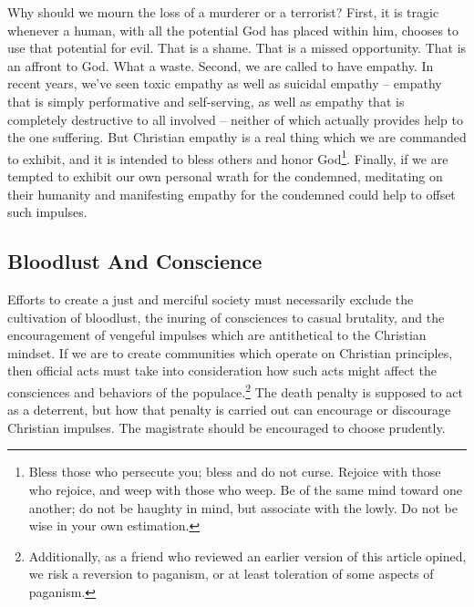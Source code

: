 Why should we mourn the loss of a murderer or a terrorist? First, it is tragic whenever a human, with all the potential God has placed within him, chooses to use that potential for evil.  That is a shame.  That is a missed opportunity.  That is an affront to God.  What a waste.  Second, we are called to have empathy.  In recent years, we've seen toxic empathy as well as suicidal empathy -- empathy that is simply performative and self-serving, as well as empathy that is completely destructive to all involved -- neither of which actually provides help to the one suffering.  But Christian empathy is a real thing which we are commanded to exhibit, and it is intended to bless others and honor God\footnote{Bless those who persecute you; bless and do not curse.  Rejoice with those who rejoice, and weep with those who weep.  Be of the same mind toward one another; do not be haughty in mind, but associate with the lowly.  Do not be wise in your own estimation.}.  Finally, if we are tempted to exhibit our own personal wrath for the condemned, meditating on their humanity and manifesting empathy for the condemned could help to offset such impulses.  

\subsection{Bloodlust And Conscience}
Efforts to create a just and merciful society must necessarily exclude the cultivation of bloodlust, the inuring of consciences to casual brutality, and the encouragement of vengeful impulses which are antithetical to the Christian mindset.  If we are to create communities which operate on Christian principles, then official acts must take into consideration how such acts might affect the consciences and behaviors of the populace.\footnote{Additionally, as a friend who reviewed an earlier version of this article opined, we risk a reversion to paganism, or at least toleration of some aspects of paganism.}  The death penalty is supposed to act as a deterrent, but how that penalty is carried out can encourage or discourage Christian impulses.  The magistrate should be encouraged to choose prudently.

